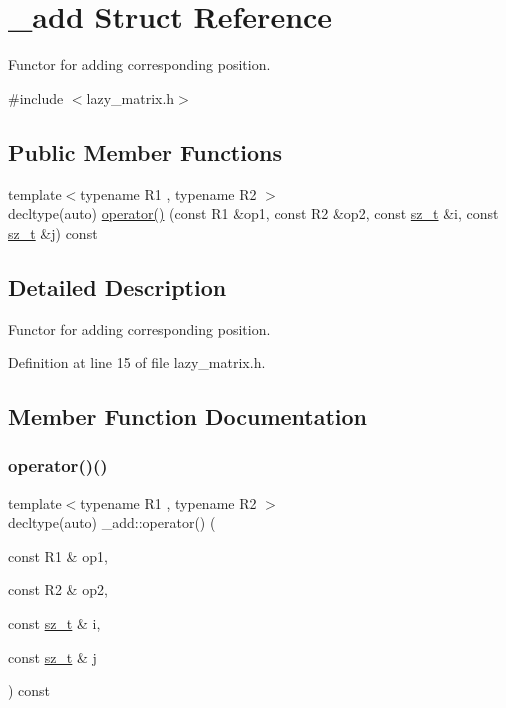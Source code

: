 \hypertarget{struct__add}{}\section{\+\_\+add Struct Reference}
\label{struct__add}


Functor for adding corresponding position.  




{\ttfamily \#include $<$lazy\+\_\+matrix.\+h$>$}

\subsection*{Public Member Functions}
\begin{DoxyCompactItemize}
\item 
{\footnotesize template$<$typename R1 , typename R2 $>$ }\\decltype(auto) \mbox{\hyperlink{struct__add_a6e89e6b34172d178dde4f429d10edf9a}{operator()}} (const R1 \&op1, const R2 \&op2, const \mbox{\hyperlink{lazy__matrix_8h_acba2745dcfc55b2d05ff45adc6a0a015}{sz\+\_\+t}} \&i, const \mbox{\hyperlink{lazy__matrix_8h_acba2745dcfc55b2d05ff45adc6a0a015}{sz\+\_\+t}} \&j) const
\end{DoxyCompactItemize}


\subsection{Detailed Description}
Functor for adding corresponding position. 

Definition at line 15 of file lazy\+\_\+matrix.\+h.



\subsection{Member Function Documentation}
\mbox{\label{struct__add_a6e89e6b34172d178dde4f429d10edf9a}} 
\subsubsection{\texorpdfstring{operator()()}{operator()()}}
{\footnotesize\ttfamily template$<$typename R1 , typename R2 $>$ \\
decltype(auto) \+\_\+add\+::operator() (\begin{DoxyParamCaption}\item[{const R1 \&}]{op1,  }\item[{const R2 \&}]{op2,  }\item[{const \mbox{\hyperlink{lazy__matrix_8h_acba2745dcfc55b2d05ff45adc6a0a015}{sz\+\_\+t}} \&}]{i,  }\item[{const \mbox{\hyperlink{lazy__matrix_8h_acba2745dcfc55b2d05ff45adc6a0a015}{sz\+\_\+t}} \&}]{j }\end{DoxyParamCaption}) const\hspace{0.3cm}{\ttfamily [inline]}}



